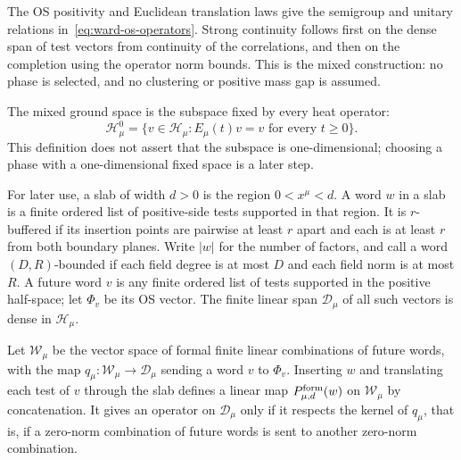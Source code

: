 The OS positivity and Euclidean translation laws give the semigroup and unitary relations in~\eqref{eq:ward-os-operators}. Strong continuity follows first on the dense span of test vectors from continuity of the correlations, and then on the completion using the operator norm bounds. This is the mixed construction: no phase is selected, and no clustering or positive mass gap is assumed.

The mixed ground space is the subspace fixed by every heat operator:
\begin{equation}\label{eq:ward-ground-space}
 \mathcal H_\mu^0=\{v\in\mathcal H_\mu:E_\mu(t)v=v\text{ for every }t\ge0\}.
\end{equation}
This definition does not assert that the subspace is one-dimensional; choosing a phase with a one-dimensional fixed space is a later step.

For later use, a slab of width $d>0$ is the region $0<x^\mu<d$. A word $w$ in a slab is a finite ordered list of positive-side tests supported in that region. It is $r$-buffered if its insertion points are pairwise at least $r$ apart and each is at least $r$ from both boundary planes. Write $|w|$ for the number of factors, and call a word $(D,R)$-bounded if each field degree is at most $D$ and each field norm is at most $R$. A future word $v$ is any finite ordered list of tests supported in the positive half-space; let $\Phi_v$ be its OS vector. The finite linear span $\mathcal D_\mu$ of all such vectors is dense in $\mathcal H_\mu$.

Let $\mathcal W_\mu$ be the vector space of formal finite linear combinations of future words, with the map $q_\mu:\mathcal W_\mu\to\mathcal D_\mu$ sending a word $v$ to $\Phi_v$. Inserting $w$ and translating each test of $v$ through the slab defines a linear map $P^{\rm form}_{\mu,d}(w)$ on $\mathcal W_\mu$ by concatenation. It gives an operator on $\mathcal D_\mu$ only if it respects the kernel of $q_\mu$, that is, if a zero-norm combination of future words is sent to another zero-norm combination.

